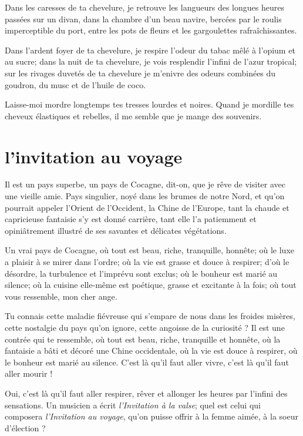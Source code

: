 Dans les caresses de ta chevelure, je retrouve les langueurs des longues
heures passées sur un divan, dans la chambre d’un beau
navire, bercées par le roulis imperceptible du port, entre les pots de
fleurs et les gargoulettes rafraîchissantes.

Dans l’ardent foyer de ta chevelure, je respire
l’odeur du tabac mêlé à l’opium et au
sucre; dans la nuit de ta chevelure, je vois resplendir
l’infini de l’azur tropical; sur les
rivages duvetés de ta chevelure je m’enivre des odeurs
combinées du goudron, du musc et de l’huile de coco.

Laisse{}-moi mordre longtemps tes tresses lourdes et noires. Quand je
mordille tes cheveux élastiques et rebelles, il me semble que je mange
des souvenirs.
\ \\

\quebra\section[L’invitation au voyage]{l’invitation au voyage}

Il est un pays superbe, un pays de Cocagne, dit{}-on, que je rêve de
visiter avec une vieille amie. Pays singulier, noyé dans les brumes de
notre Nord, et qu’on pourrait appeler
l’Orient de l’Occident, la Chine de
l’Europe, tant la chaude et capricieuse fantaisie
s’y est donné carrière, tant elle l’a
patiemment et opiniâtrement illustré de ses savantes et délicates
végétations.

Un vrai pays de Cocagne, où tout est beau, riche, tranquille, honnête;
où le luxe a plaisir à se mirer dans l’ordre; où la
vie est grasse et douce à respirer; d’où le désordre,
la turbulence et l’imprévu sont exclus; où le bonheur
est marié au silence; où la cuisine elle{}-même est poétique, grasse et
excitante à la fois; où tout vous ressemble, mon cher ange.

Tu connais cette maladie fiévreuse qui s’empare de nous
dans les froides misères, cette nostalgie du pays
qu’on ignore, cette angoisse de la curiosité ? Il est
une contrée qui te ressemble, où tout est beau, riche, tranquille et
honnête, où la fantaisie a bâti et décoré une Chine occidentale, où la
vie est douce à respirer, où le bonheur est marié au silence.
C’est là qu’il faut aller vivre,
c’est là qu’il faut aller mourir !

Oui, c’est là qu’il faut aller
respirer, rêver et allonger les heures par l’infini
des sensations. Un musicien a écrit \textit{l’Invitation à la
valse}; quel est celui qui composera \textit{l’Invitation au
voyage}, qu’on puisse offrir à la femme aimée, à la
soeur d’élection ?

